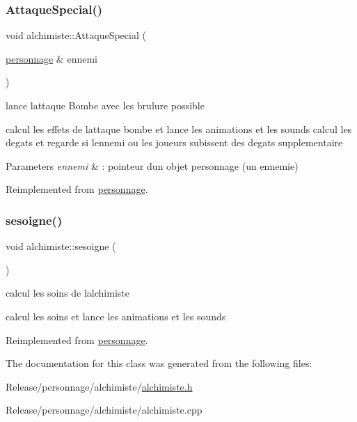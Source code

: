 \subsubsection{\texorpdfstring{Attaque\+Special()}{AttaqueSpecial()}}
{\footnotesize\ttfamily void alchimiste\+::\+Attaque\+Special (\begin{DoxyParamCaption}\item[{\mbox{\hyperlink{classpersonnage}{personnage}} \&}]{ennemi }\end{DoxyParamCaption})\hspace{0.3cm}{\ttfamily [virtual]}}



lance l\textquotesingle{}attaque Bombe avec les brulure possible 

calcul les effets de l\textquotesingle{}attaque bombe et lance les animations et les sounds calcul les degats et regarde si l\textquotesingle{}ennemi ou les joueurs subissent des degats supplementaire ~\newline
 
\begin{DoxyParams}{Parameters}
{\em ennemi} & \+: pointeur d\textquotesingle{}un objet personnage (un ennemie) \\
\hline
\end{DoxyParams}


Reimplemented from \mbox{\hyperlink{classpersonnage_ab8f27aff95ffc033fb22d56e549bd415}{personnage}}.

\mbox{\label{classalchimiste_a6c5aabd22117117c285c8230bd7b5692}} 
\subsubsection{\texorpdfstring{sesoigne()}{sesoigne()}}
{\footnotesize\ttfamily void alchimiste\+::sesoigne (\begin{DoxyParamCaption}{ }\end{DoxyParamCaption})\hspace{0.3cm}{\ttfamily [virtual]}}



calcul les soins de l\textquotesingle{}alchimiste 

calcul les soins et lance les animations et les sounds 

Reimplemented from \mbox{\hyperlink{classpersonnage_a53539db23cbf909d2c4b025ff2ac2e45}{personnage}}.



The documentation for this class was generated from the following files\+:\begin{DoxyCompactItemize}
\item 
Release/personnage/alchimiste/\mbox{\hyperlink{alchimiste_8h}{alchimiste.\+h}}\item 
Release/personnage/alchimiste/alchimiste.\+cpp\end{DoxyCompactItemize}
